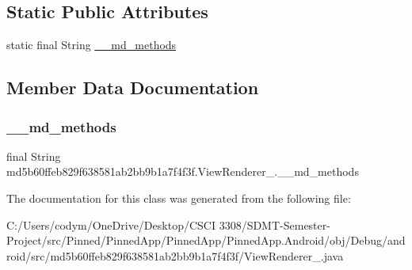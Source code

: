 \subsection*{Static Public Attributes}
\begin{DoxyCompactItemize}
\item 
static final String \hyperlink{classmd5b60ffeb829f638581ab2bb9b1a7f4f3f_1_1_view_renderer__2_a80b609e3e4054c380887d4dc2907a875}{\+\_\+\+\_\+md\+\_\+methods}
\end{DoxyCompactItemize}


\subsection{Member Data Documentation}
\mbox{\label{classmd5b60ffeb829f638581ab2bb9b1a7f4f3f_1_1_view_renderer__2_a80b609e3e4054c380887d4dc2907a875}} 
\subsubsection{\texorpdfstring{\+\_\+\+\_\+md\+\_\+methods}{\_\_md\_methods}}
{\footnotesize\ttfamily final String md5b60ffeb829f638581ab2bb9b1a7f4f3f.\+View\+Renderer\+\_.\+\_\+\+\_\+md\+\_\+methods\hspace{0.3cm}{\ttfamily [static]}}



The documentation for this class was generated from the following file\+:\begin{DoxyCompactItemize}
\item 
C\+:/\+Users/codym/\+One\+Drive/\+Desktop/\+C\+S\+C\+I 3308/\+S\+D\+M\+T-\/\+Semester-\/\+Project/src/\+Pinned/\+Pinned\+App/\+Pinned\+App/\+Pinned\+App.\+Android/obj/\+Debug/android/src/md5b60ffeb829f638581ab2bb9b1a7f4f3f/View\+Renderer\+\_.\+java\end{DoxyCompactItemize}

